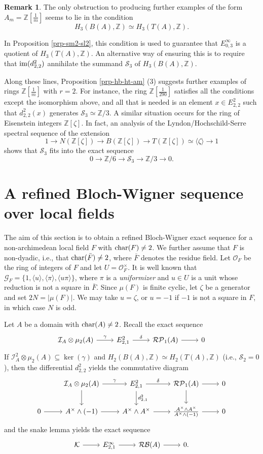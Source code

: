 \documentclass[11pt]{amsart}
\theoremstyle{definition}
\theoremstyle{plain}
\theoremstyle{definition}
\newtheorem{rem}[ntn]{Remark}
\numberwithin{equation}{section}
\newcommand{\z}{\mathbb{Z}}
\newcommand{\GG}{\mathcal{G}}
\newcommand{\II}{\mathcal{I}}
\newcommand{\RP}{\mathcal{RP}}
\newcommand{\RB}{\mathcal{RB}}
\renewcommand{\SS}{\mathcal{S}}
\renewcommand{\aa}{{A^\times}}
\newcommand{\mth}[1]{\left[ \frac{1}{#1} \right]}
\newcommand{\lan}{\langle}
\newcommand{\ran}{\rangle}
\newcommand{\im}{{\rm im}}
\renewcommand{\char}{{\rm char}}
\begin{document}
	\begin{rem}\label{lack-on-zm}
		The only obstruction to producing further examples of the form $A_m=\z\mth{m}$ seems to lie in the condition 
		\[
		H_3(B(A),\z)\simeq H_3(T(A),\z).    
		\]
		
		In Proposition \ref{prp-sm2-sl2}, this condition is used to guarantee that $E^\infty_{0,3}$ is a quotient of $H_3(T(A),\z)$. An alternative way of ensuring this is to require that $\im(d^2_{2,2})$ annihilate the summand $\SS_3$ of $H_3(B(A),\z)$.
		
		Along these lines, Proposition \ref{prp-hb-ht-am} (3) suggests further examples of rings $\z\mth{m}$ with $r=2$. For instance, the ring $\z\mth{290}$ satisfies all the conditions except the isomorphism above, and all that is needed is an element $x\in E^2_{2,2}$ such that $d^2_{2,2}(x)$ generates $\SS_3\simeq\z/3$. A similar situation occurs for the ring of Eisenstein integers $\z[\zeta]$. In fact, an analysis of the Lyndon/Hochschild-Serre spectral sequence of the extension
		\[
		1\to N(\z[\zeta]) \to B(\z[\zeta])\to T(\z[\zeta])\simeq\lan\zeta\ran\to 1
		\]
		shows that $\SS_3$ fits into the exact sequence
		\[
		0\to \z/6\to\SS_3\to \z/3\to 0.
		\]
	\end{rem}
	\section{A refined Bloch-Wigner sequence over local fields}
	The aim of this section is to obtain a refined Bloch-Wigner exact sequence for a non-archimedean local field $F$ with $\char(F)\neq 2$. We further assume that $F$ is non-dyadic, i.e., that $\char(\bar{F})\neq 2$, where $\bar{F}$ denotes the residue field. Let $\mathcal{O}_F$ be the ring of integers of $F$ and let $U=\mathcal{O}_F^\times$. It is well known that $\GG_F=\{1,\lan u\ran,\lan \pi\ran,\lan u\pi\ran\}$, where $\pi$ is a {\it uniformizer} and $u\in U$ is a unit whose reduction is not a square in $\bar{F}$. Since $\mu(F)$ is finite cyclic, let $\zeta$ be a generator and set $2N=|\mu(F)|$. We may take $u=\zeta$, or $u=-1$ if $-1$ is not a square in $F$, in which case $N$ is odd.
	
	Let $A$ be a domain with $\char(A)\neq 2$. Recall the exact sequence
	\[
	\begin{tikzcd}
		\II_A\otimes\mu_2(A)\ar[r,"\gamma"] & E^2_{2,1}\ar[r,"\delta"] & \RP_1(A) \ar[r] & 0
	\end{tikzcd}
	\]
	If $\II_A^2\otimes\mu_2(A)\subseteq\ker(\gamma)$ and $H_2(B(A),\z)\simeq H_2(T(A),\z)$ (i.e., $\SS_2=0$), then the differential $d^2_{2,2}$ yields the commutative diagram
	\[
	\begin{tikzcd}
		&\II_A\otimes\mu_2(A)\ar[r,"\gamma"]\ar[d] & E^2_{2,1}\ar[r,"\delta"]\ar[d,"d^2_{2,1}"] & \RP_1(A) \ar[r]\ar[d] & 0\\
		0 \ar[r] & \aa\wedge(-1) \ar[r]& \aa\wedge\aa \ar[r] & \frac{\aa\wedge\aa}{\aa\wedge(-1)} \ar[r] & 0
	\end{tikzcd}
	\]
	and the snake lemma yields the exact sequence
	\[
	\begin{tikzcd}
		\mathcal{K}\ar[r] & E^{\infty}_{2,1}\ar[r] & \RB(A)\ar[r] & 0.
	\end{tikzcd}
	\]
	
\end{document}
